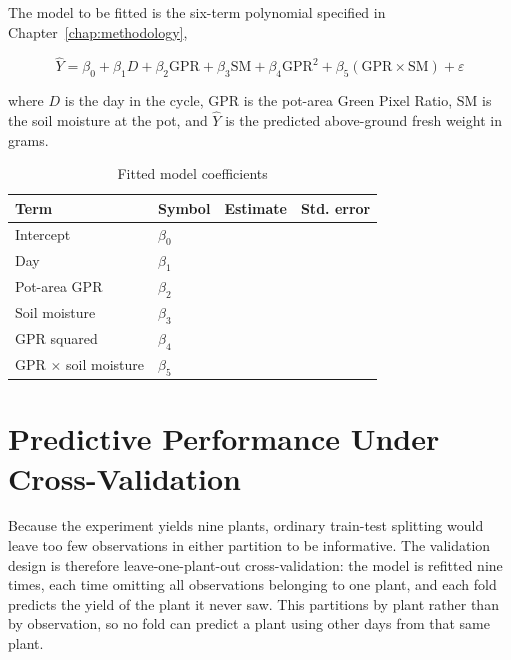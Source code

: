 The model to be fitted is the six-term polynomial specified in
Chapter~\ref{chap:methodology},

\begin{equation}
\hat{Y} = \beta_0 + \beta_1 D + \beta_2 \mathrm{GPR} + \beta_3 \mathrm{SM}
        + \beta_4 \mathrm{GPR}^2 + \beta_5 (\mathrm{GPR} \times \mathrm{SM})
        + \varepsilon
\label{eq:model_ch4}
\end{equation}

where $D$ is the day in the cycle, $\mathrm{GPR}$ is the pot-area Green Pixel
Ratio, $\mathrm{SM}$ is the soil moisture at the pot, and $\hat{Y}$ is the
predicted above-ground fresh weight in grams.

\begin{table}[ht]
\centering
\caption{Fitted model coefficients}
\label{tab:coefficients}
\begin{tabular}{llrr}
\toprule
\textbf{Term} & \textbf{Symbol} & \textbf{Estimate} & \textbf{Std. error} \\
\midrule
Intercept                 & $\beta_0$ & & \\
Day                       & $\beta_1$ & & \\
Pot-area GPR              & $\beta_2$ & & \\
Soil moisture             & $\beta_3$ & & \\
GPR squared               & $\beta_4$ & & \\
GPR $\times$ soil moisture & $\beta_5$ & & \\
\bottomrule
\end{tabular}
\end{table}

\section{Predictive Performance Under Cross-Validation}


Because the experiment yields nine plants, ordinary train-test splitting would
leave too few observations in either partition to be informative. The
validation design is therefore leave-one-plant-out cross-validation: the model
is refitted nine times, each time omitting all observations belonging to one
plant, and each fold predicts the yield of the plant it never saw. This
partitions by plant rather than by observation, so no fold can predict a plant
using other days from that same plant.

